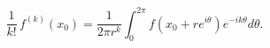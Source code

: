 \[\frac{1}{k!}\,f^{(k)}(x_{0})=\frac{1}{2\pi r^{k}}\int_{0}^{2\pi}f(x_{0}+re^{i%
\theta})e^{-ik\theta}d\theta.\]